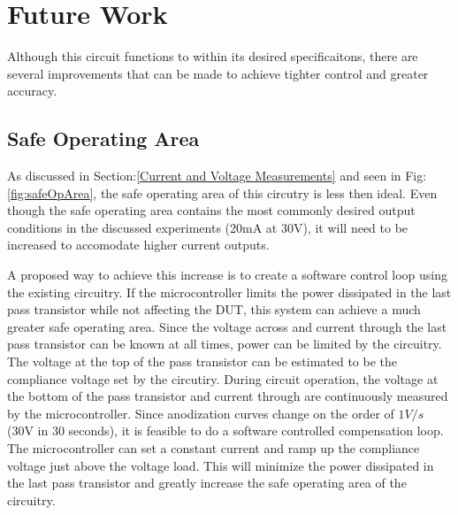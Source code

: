 \section{Future Work}

Although this circuit functions to within its desired specificaitons, there are several improvements that can be made to achieve tighter control and greater accuracy.

\subsection{Safe Operating Area}

As discussed in Section:\ref{Current and Voltage Measurements} and seen in Fig:\ref{fig:safeOpArea}, the safe operating area of this circutry is less then ideal. Even though the safe operating area contains the most commonly desired output conditions in the discussed experiments (20mA at 30V), it will need to be increased to accomodate higher current outputs.

A proposed way to achieve this increase is to create a software control loop using the existing circuitry. If the microcontroller limits the power dissipated in the last pass transistor while not affecting the DUT, this system can achieve a much greater safe operating area. Since the voltage across and current through the last pass transistor can be known at all times, power can be limited by the circuitry. The voltage at the top of the pass transistor can be estimated to be the compliance voltage set by the circutiry. During circuit operation, the voltage at the bottom of the pass transistor and current through are continuously measured by the microcontroller. Since anodization curves change on the order of $1 V/s$ (30V in 30 seconds), it is feasible to do a software controlled compensation loop. The microcontroller can set a constant current and ramp up the compliance voltage just above the voltage load. This will minimize the power dissipated in the last pass transistor and greatly increase the safe operating area of the circuitry.
